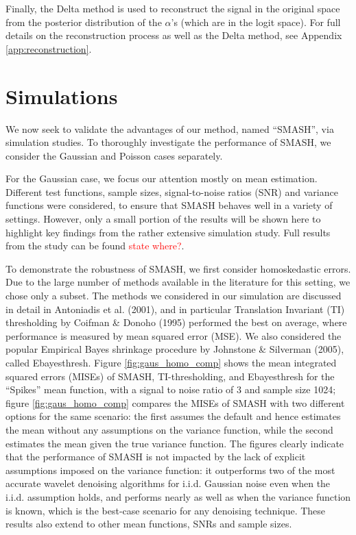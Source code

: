 \documentclass[12pt]{article}
\newcommand{\Ga}{\alpha}
\begin{document}
Finally, the Delta method is used to reconstruct the signal in the original space from the posterior distribution of the $\Ga$'s (which are in the logit space). For full details on the reconstruction process as well as the Delta method, see Appendix \ref{app:reconstruction}.
\section{Simulations}
We now seek to validate the advantages of our method, named ``SMASH'', via simulation studies. To thoroughly investigate the performance of SMASH, we consider the Gaussian and Poisson cases separately. 

For the Gaussian case, we focus our attention mostly on mean estimation. Different test functions, sample sizes, signal-to-noise ratios (SNR) and variance functions were considered, to ensure that SMASH behaves well in a variety of settings. However, only a small portion of the results will be shown here to highlight key findings from the rather extensive simulation study. Full results from the study can be found \textcolor{red}{state where?}.  

To demonstrate the robustness of SMASH, we first consider homoskedastic errors. Due to the large number of methods available in the literature for this setting, we chose only a subset. The methods we considered in our simulation are discussed in detail in Antoniadis et al. (2001), and in particular Translation Invariant (TI) thresholding by Coifman \& Donoho (1995) performed the best on average, where performance is measured by mean squared error (MSE). We also considered the popular Empirical Bayes shrinkage procedure by Johnstone \& Silverman (2005), called Ebayesthresh. Figure \ref{fig:gaus_homo_comp} shows the mean integrated squared errors (MISEs) of SMASH, TI-thresholding, and Ebayesthresh for the ``Spikes'' mean function, with a signal to noise ratio of 3 and sample size 1024; figure \ref{fig:gaus_homo_comp} compares the MISEs of SMASH with two different options for the same scenario: the first assumes the default and hence estimates the mean without any assumptions on the variance function, while the second estimates the mean given the true variance function. The figures clearly indicate that the performance of SMASH is not impacted by the lack of explicit assumptions imposed on the variance function: it outperforms two of the most accurate wavelet denoising algorithms for i.i.d. Gaussian noise even when the i.i.d. assumption holds, and performs nearly as well as when the variance function is known, which is the best-case scenario for any denoising technique. These results also extend to other mean functions, SNRs and sample sizes.
\end{document}
